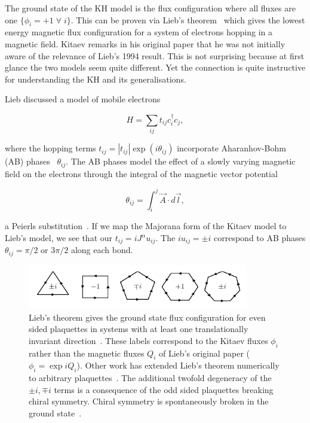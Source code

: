 The ground state of the KH model is the flux configuration where all fluxes are one \(\{\phi_i = +1\; \forall \; i\}\). This can be proven via Lieb's theorem~\autocite{lieb_flux_1994} which gives the lowest energy magnetic flux configuration for a system of electrons hopping in a magnetic field. Kitaev remarks in his original paper that he was not initially aware of the relevance of Lieb's 1994 result. This is not surprising because at first glance the two models seem quite different. Yet the connection is quite instructive for understanding the KH and its generalisations.

Lieb discussed a model of mobile electrons

\[H = \sum_{ij} t_{ij} c^\dagger_i c_j,\]

where the hopping terms \(t_{ij} = |t_{ij}|\exp(i\theta_{ij})\) incorporate Aharanhov-Bohm (AB) phases~\autocite{aharonovSignificanceElectromagneticPotentials1959} \(\theta_{ij}\). The AB phases model the effect of a slowly varying magnetic field on the electrons through the integral of the magnetic vector potential

\[\theta_{ij} = \int_i^j \vec{A} \cdot d\vec{l},\]

a Peierls substitution~\autocite{peierlsZurTheorieDiamagnetismus1933}. If we map the Majorana form of the Kitaev model to Lieb's model, we see that our \(t_{ij} = i J^\alpha u_{ij}\). The \(i u_{ij} = \pm i\) correspond to AB phases \(\theta_{ij} = \pi/2\) or \(3\pi/2\) along each bond.

\hypertarget{fig:regular_plaquettes}{%
\begin{figure}
\centering
\includegraphics[width=0.86\textwidth,height=\textheight]{figure_code/amk_chapter/intro/regular_plaquettes/regular_plaquettes}
\caption[{Plaquettes in the Kitaev Model}]{Lieb's theorem gives the ground state flux configuration for even sided plaquettes in systems with at least one translationally invariant direction~\autocite{lieb_flux_1994}. These labels correspond to the Kitaev fluxes \(\phi_i\) rather than the magnetic fluxes \(Q_i\) of Lieb's original paper (\(\phi_i = \exp{iQ_i}\)). Other work has extended Lieb's theorem numerically to arbitrary plaquettes~\autocite{eschmannThermodynamicClassificationThreedimensional2020,Yao2009,eschmann2019thermodynamics,Peri2020}. The additional twofold degeneracy of the \(\pm i, \mp i\) terms is a consequence of the odd sided plaquettes breaking chiral symmetry. Chiral symmetry is spontaneously broken in the ground state~\autocite{Yao2009}.}
\label{fig:regular_plaquettes}
\end{figure}
}

